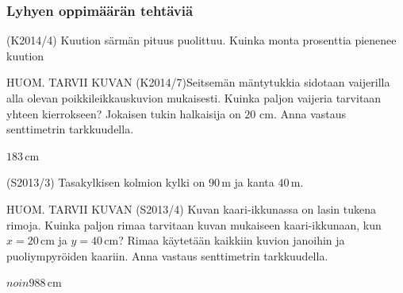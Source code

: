 



\subsubsection*{Lyhyen oppimäärän tehtäviä}


\begin{tehtava}
	(K2014/4)  Kuution särmän pituus puolittuu. Kuinka monta prosenttia pienenee kuution
	\begin{alakohdat}
	\end{alakohdat}
						
						\begin{vastaus}
						\begin{alakohdat}
						 \alakohta{$87,5\%$}
						 \alakohta{$75\%$}
						\end{alakohdat}					  
	\end{vastaus}
	\end{tehtava}

\begin{tehtava}
HUOM. TARVII KUVAN 
(K2014/7)Seitsemän mäntytukkia sidotaan vaijerilla alla olevan poikkileikkauskuvion mukaisesti. Kuinka paljon vaijeria tarvitaan yhteen kierrokseen? Jokaisen tukin halkaisija on $20$ cm.
Anna vastaus senttimetrin tarkkuudella. 
  \begin{vastaus}
  $183$\,cm
  \end{vastaus}
\end{tehtava}

\begin{tehtava}(S2013/3) Tasakylkisen kolmion kylki on $90$\,m ja kanta $40$\,m.
\begin{alakohdat}
 \end{alakohdat}
    \begin{vastaus}
    \begin{alakohdat}
	\alakohta{$26\circ$}
	\alakohta{$1755$\,m^2}
   \end{alakohdat}
 \end{vastaus}
\end{tehtava}

\begin{tehtava}
HUOM. TARVII KUVAN 
(S2013/4) Kuvan kaari-ikkunassa on lasin tukena rimoja. Kuinka paljon rimaa tarvitaan kuvan mukaiseen kaari-ikkunaan, kun $x=20$\,cm ja $y=40$\,cm? Rimaa käytetään kaikkiin kuvion janoihin ja puoliympyröiden kaariin. Anna vastaus senttimetrin tarkkuudella.
  \begin{vastaus}
  $noin 988$\,cm
  \end{vastaus}
\end{tehtava}

